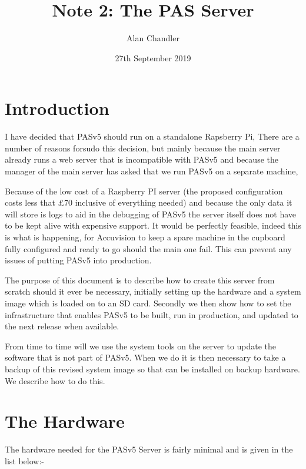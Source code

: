 \documentclass[Draft]{akc}
\author{Alan Chandler}
\title{Note 2: The PAS Server}
\date{27th September 2019}
\begin{document}
\maketitle
{}
\tableofcontents
\section{Introduction}

I have decided that PASv5 should run on a standalone Rapsberry Pi, There are a number of reasons forsudo
this decision, but mainly because the main server already runs a web server that is incompatible
with PASv5 and because the manager of the main server has asked that we run PASv5 on a separate
machine,

Because of the low cost of a Raspberry PI server (the proposed configuration costs less that £70
inclusive of everything needed) and because the only data it will store is logs to aid in the
debugging of PASv5 the server itself does not have to be kept alive with expensive support.  It
would be perfectly feasible, indeed this is what is happening, for Accuvision to keep a spare
machine in the cupboard fully configured and ready to go should the main one fail.  This can prevent
any issues of putting PASv5 into production.

The purpose of this document is to describe how to create this server from scratch should it ever be
necessary, initially setting up the hardware and a system image which is loaded on to an SD card.
Secondly we then show how to set the infrastructure that enables PASv5 to be built, run in
production, and updated to the next release when available.

From time to time will we use the system tools on the server to update the software that is not part
of PASv5. When we do it is then necessary to take a backup of this revised system image so that can
be installed on backup hardware.  We describe how to do this.

\section{The Hardware}

The hardware needed for the PASv5 Server is fairly minimal and is given in the list below:-
\end{document}
